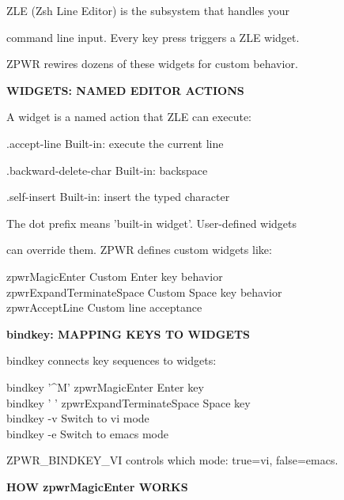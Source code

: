 \documentclass[11pt,a4paper,twoside]{book}
\begin{document}
ZLE (Zsh Line Editor) is the subsystem that handles your

command line input. Every key press triggers a ZLE widget.

ZPWR rewires dozens of these widgets for custom behavior.


\vspace{12pt}
{\bfseries\color{neonyellow} WIDGETS: NAMED EDITOR ACTIONS}\vspace{4pt}

A widget is a named action that ZLE can execute:

.accept-line          Built-in: execute the current line

.backward-delete-char  Built-in: backspace

.self-insert           Built-in: insert the typed character

The dot prefix means 'built-in widget'. User-defined widgets

can override them. ZPWR defines custom widgets like:

\begin{codebox}
zpwrMagicEnter         Custom Enter key behavior\\
zpwrExpandTerminateSpace Custom Space key behavior\\
zpwrAcceptLine          Custom line acceptance\\
\end{codebox}


\vspace{12pt}
{\bfseries\color{neonyellow} bindkey: MAPPING KEYS TO WIDGETS}\vspace{4pt}

bindkey connects key sequences to widgets:

\begin{codebox}
bindkey '\textasciicircum{}M' zpwrMagicEnter    Enter key\\
bindkey ' ' zpwrExpandTerminateSpace  Space key\\
bindkey -v                     Switch to vi mode\\
bindkey -e                     Switch to emacs mode\\
\end{codebox}

ZPWR\_BINDKEY\_VI controls which mode: true=vi, false=emacs.


\vspace{12pt}
{\bfseries\color{neonyellow} HOW zpwrMagicEnter WORKS}\vspace{4pt}
\end{document}
